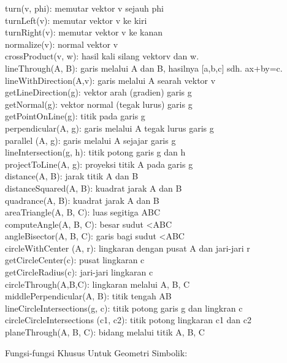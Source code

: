 \documentclass[
]{book}
\begin{document}
turn(v, phi): memutar vektor v sejauh phi\\
turnLeft(v): memutar vektor v ke kiri\\
turnRight(v): memutar vektor v ke kanan\\
normalize(v): normal vektor v\\
crossProduct(v, w): hasil kali silang vektorv dan w.\\
lineThrough(A, B): garis melalui A dan B, hasilnya {[}a,b,c{]} sdh. ax+by=c.\\
lineWithDirection(A,v): garis melalui A searah vektor v\\
getLineDirection(g): vektor arah (gradien) garis g\\
getNormal(g): vektor normal (tegak lurus) garis g\\
getPointOnLine(g): titik pada garis g\\
perpendicular(A, g): garis melalui A tegak lurus garis g\\
parallel (A, g): garis melalui A sejajar garis g\\
lineIntersection(g, h): titik potong garis g dan h\\
projectToLine(A, g): proyeksi titik A pada garis g\\
distance(A, B): jarak titik A dan B\\
distanceSquared(A, B): kuadrat jarak A dan B\\
quadrance(A, B): kuadrat jarak A dan B\\
areaTriangle(A, B, C): luas segitiga ABC\\
computeAngle(A, B, C): besar sudut \textless ABC\\
angleBisector(A, B, C): garis bagi sudut \textless ABC\\
circleWithCenter (A, r): lingkaran dengan pusat A dan jari-jari r\\
getCircleCenter(c): pusat lingkaran c\\
getCircleRadius(c): jari-jari lingkaran c\\
circleThrough(A,B,C): lingkaran melalui A, B, C\\
middlePerpendicular(A, B): titik tengah AB\\
lineCircleIntersections(g, c): titik potong garis g dan lingkran c\\
circleCircleIntersections (c1, c2): titik potong lingkaran c1 dan c2\\
planeThrough(A, B, C): bidang melalui titik A, B, C

Fungsi-fungsi Khusus Untuk Geometri Simbolik:
\end{document}
